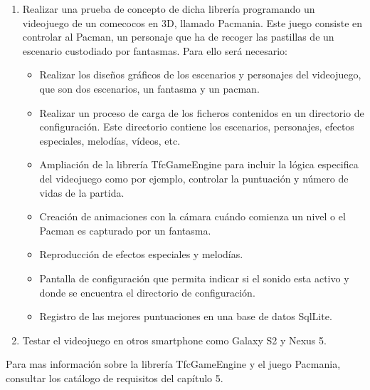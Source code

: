 \begin{enumerate}
\item Realizar una prueba de concepto de dicha librería programando un videojuego de un comecocos en 3D, llamado Pacmania. Este juego consiste en controlar al Pacman, un personaje que ha de recoger las pastillas de un escenario custodiado por fantasmas. Para ello será necesario:
	\begin{itemize}
	\item Realizar los diseños gráficos de los escenarios y personajes del videojuego, que son dos escenarios, un fantasma y un pacman.
	\item Realizar un proceso de carga de los ficheros contenidos en un directorio de configuración. Este directorio contiene los escenarios, personajes, efectos especiales, melodías, vídeos, etc.
	\item Ampliación de la librería TfcGameEngine para incluir la lógica especifica del videojuego como por ejemplo, controlar la puntuación y número de vidas de la partida.
	\item Creación de animaciones con la cámara cuándo comienza un nivel o el Pacman es capturado por un fantasma.
	\item Reproducción de efectos especiales y melodías.
	\item Pantalla de configuración que permita indicar si el sonido esta activo y donde se encuentra el directorio de configuración.
	\item Registro de las mejores puntuaciones en una base de datos SqlLite.
	\end{itemize}
\item Testar el videojuego en otros smartphone como Galaxy S2 y Nexus 5.
\end{enumerate}

Para mas información sobre la librería TfcGameEngine y el juego Pacmania, consultar los catálogo de requisitos del capítulo 5.